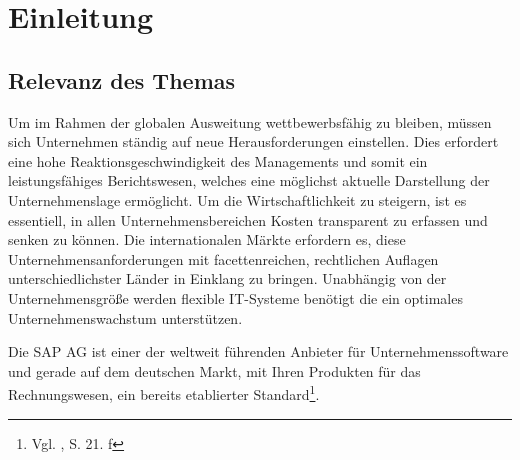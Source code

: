 \section{Einleitung}
\subsection{Relevanz des Themas}
Um im Rahmen der globalen Ausweitung wettbewerbsfähig zu bleiben, müssen sich Unternehmen ständig auf neue Herausforderungen einstellen. Dies erfordert eine hohe Reaktionsgeschwindigkeit des Managements und somit ein leistungsfähiges Berichtswesen, welches eine möglichst aktuelle Darstellung der Unternehmenslage ermöglicht. Um die Wirtschaftlichkeit zu steigern, ist es essentiell, in allen Unternehmensbereichen Kosten transparent zu erfassen und senken zu können. 
Die internationalen Märkte erfordern es, diese Unternehmensanforderungen mit facettenreichen, rechtlichen Auflagen unterschiedlichster Länder in Einklang zu bringen. 
Unabhängig von der Unternehmensgröße werden flexible IT-Systeme benötigt die ein optimales Unternehmenswachstum unterstützen.

Die SAP AG ist einer der weltweit führenden Anbieter für Unternehmenssoftware und gerade auf dem deutschen Markt, mit Ihren Produkten für das Rechnungswesen, ein bereits etablierter Standard\footnote{Vgl. \cite{Patel2009}, S. 21. f}.

 
%

